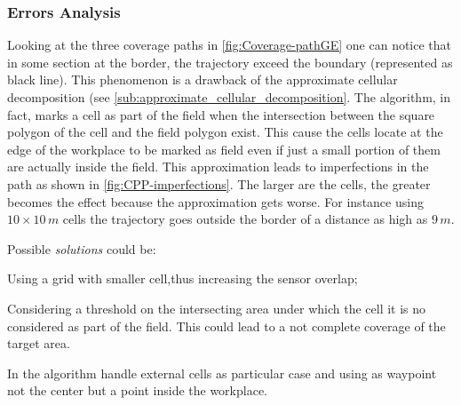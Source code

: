 \subsubsection{Errors Analysis} %
\label{ssub:errors_analysis}
Looking at the three coverage paths in \autoref{fig:Coverage-pathGE} one can notice that in some section at the border, the trajectory exceed the boundary (represented as black line). This phenomenon is a drawback of the approximate cellular decomposition (see \autoref{sub:approximate_cellular_decomposition}. The algorithm, in fact, marks a cell as part of the field when the intersection between the square polygon of the cell and the field polygon
exist. This cause the cells locate at the edge of the workplace to be marked as field even if just a small portion of them are actually inside the field. This approximation leads to imperfections in the path as shown in \autoref{fig:CPP-imperfections}. The larger are the cells, the greater becomes the effect because the approximation gets worse. For instance using $10 \times 10\, m$ cells the trajectory goes outside the border of a distance as high as $9\, m$.\par
Possible \textit{solutions} could be:
 \begin{enumerate*}
	\item Using a grid with smaller cell,thus increasing the sensor overlap;
	\item Considering a threshold on the intersecting area under which the cell it is no considered as part of the field. This could lead to a not complete coverage of the target area.
	\item In the algorithm handle external cells as particular case and using as waypoint not the center but a point inside the workplace.
\end{enumerate*}

